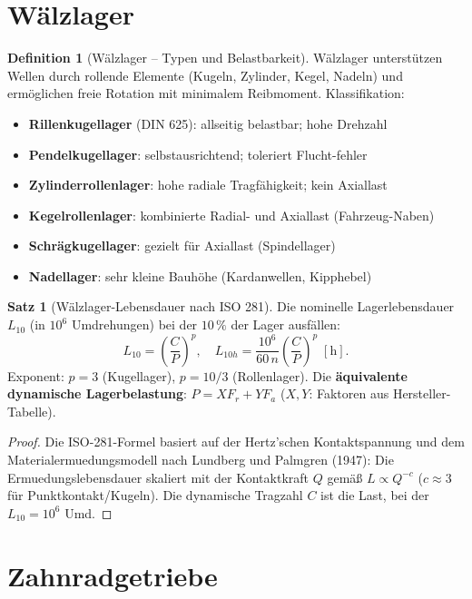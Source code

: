 ﻿\documentclass[a4paper,12pt]{report}
\theoremstyle{definition}
\newtheorem{definition}{Definition}
\newtheorem{satz}{Satz}
\begin{document}
\section{W\"alzlager}

\begin{definition}[W\"alzlager -- Typen und Belastbarkeit]
W\"alzlager unterst\"utzen Wellen durch rollende Elemente (Kugeln, Zylinder,
Kegel, Nadeln) und erm\"oglichen freie Rotation mit minimalem Reibmoment.
Klassifikation:
\begin{itemize}
    \item[-] \textbf{Rillenkugellager} (DIN 625): allseitig belastbar; hohe Drehzahl
    \item[-] \textbf{Pendelkugellager}: selbstausrichtend; toleriert Flucht-fehler
    \item[-] \textbf{Zylinderrollenlager}: hohe radiale Tragf\"ahigkeit; kein Axiallast
    \item[-] \textbf{Kegelrollenlager}: kombinierte Radial- und Axiallast (Fahrzeug-Naben)
    \item[-] \textbf{Schr\"agkugellager}: gezielt f\"ur Axiallast (Spindellager)
    \item[-] \textbf{Nadellager}: sehr kleine Bauh\"ohe (Kardanwellen, Kipphebel)
\end{itemize}
\end{definition}

\begin{satz}[W\"alzlager-Lebensdauer nach ISO 281]
Die nominelle Lagerlebensdauer $L_{10}$ (in $10^6$ Umdrehungen) bei der
$10\,\%$ der Lager ausf\"allen:
\[
  L_{10} = \left(\frac{C}{P}\right)^p,
  \quad
  L_{10h} = \frac{10^6}{60\,n}\left(\frac{C}{P}\right)^p\;[\mathrm{h}].
\]
Exponent: $p = 3$ (Kugellager), $p = 10/3$ (Rollenlager).
Die \textbf{\"aquivalente dynamische Lagerbelastung}:
$P = X F_r + Y F_a$ ($X, Y$: Faktoren aus Hersteller-Tabelle).
\end{satz}
\begin{proof}
Die ISO-281-Formel basiert auf der Hertz'schen Kontaktspannung und dem
Materialermuedungsmodell nach Lundberg und Palmgren (1947): Die
Ermuedungslebensdauer skaliert mit der Kontaktkraft $Q$ gem\"a\ss{}
$L \propto Q^{-c}$ ($c \approx 3$ f\"ur Punktkontakt/Kugeln).
Die dynamische Tragzahl $C$ ist die Last, bei der $L_{10} = 10^6$ Umd.
\end{proof}

\section{Zahnradgetriebe}
\end{document}

